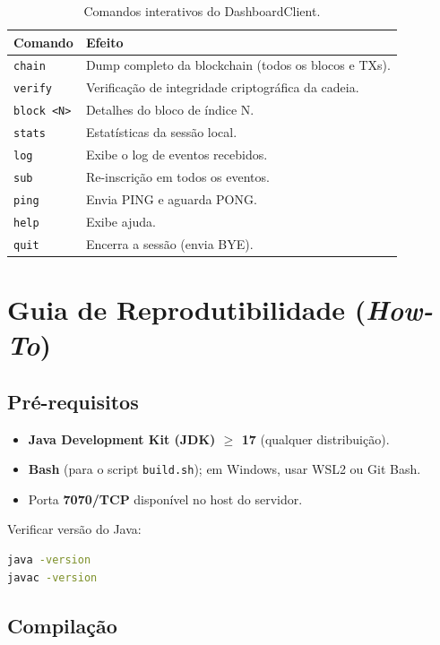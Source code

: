 \documentclass[12pt, a4paper]{article}
\begin{document}
\begin{table}[H]
\centering
\caption{Comandos interativos do DashboardClient.}
\label{tab:dash-cmds}
\begin{tabular}{ll}
\toprule
\textbf{Comando} & \textbf{Efeito} \\
\midrule
\texttt{chain}     & Dump completo da blockchain (todos os blocos e TXs). \\
\texttt{verify}    & Verificação de integridade criptográfica da cadeia. \\
\texttt{block <N>} & Detalhes do bloco de índice N. \\
\texttt{stats}     & Estatísticas da sessão local. \\
\texttt{log}       & Exibe o log de eventos recebidos. \\
\texttt{sub}       & Re-inscrição em todos os eventos. \\
\texttt{ping}      & Envia PING e aguarda PONG. \\
\texttt{help}      & Exibe ajuda. \\
\texttt{quit}      & Encerra a sessão (envia BYE). \\
\bottomrule
\end{tabular}
\end{table}


\section{Guia de Reprodutibilidade (\textit{How-To})}

\subsection{Pré-requisitos}

\begin{itemize}[nosep]
  \item \textbf{Java Development Kit (JDK) $\geq$ 17} (qualquer distribuição).
  \item \textbf{Bash} (para o script \texttt{build.sh}); em Windows, usar WSL2 ou Git Bash.
  \item Porta \textbf{7070/TCP} disponível no host do servidor.
\end{itemize}

Verificar versão do Java:
\begin{lstlisting}[language=bash, caption={Verificação do JDK.}]
java -version
javac -version
\end{lstlisting}

\subsection{Compilação}
\end{document}
